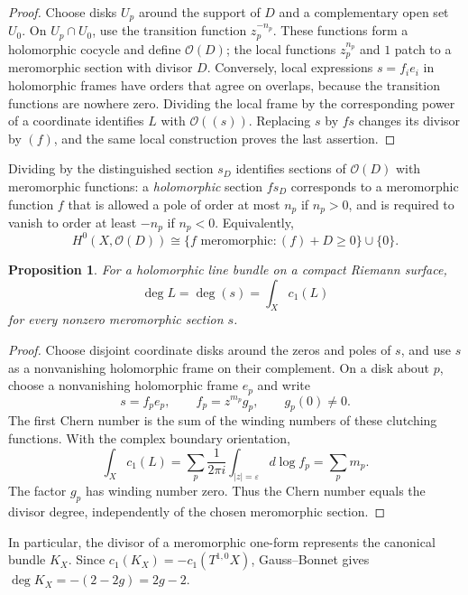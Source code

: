 \documentclass[11pt,oneside,reqno]{book}
\theoremstyle{plain}
\newtheorem{proposition}[theorem]{Proposition}
\theoremstyle{definition}
\theoremstyle{remark}
\begin{document}
\begin{proof}
Choose disks \(U_p\) around the support of \(D\) and a complementary open
set \(U_0\).  On \(U_p\cap U_0\), use the transition function
\(z_p^{-n_p}\).  These functions form a holomorphic cocycle and define
\(\mathcal O(D)\); the local functions \(z_p^{n_p}\) and \(1\) patch to a
meromorphic section with divisor \(D\).  Conversely, local expressions
\(s=f_ie_i\) in holomorphic frames have orders that agree on overlaps,
because the transition functions are nowhere zero.  Dividing the local
frame by the corresponding power of a coordinate identifies \(L\) with
\(\mathcal O((s))\).  Replacing \(s\) by \(fs\) changes its divisor by
\((f)\), and the same local construction proves the last assertion.
\end{proof}

Dividing by the distinguished section \(s_D\) identifies sections of
\(\mathcal O(D)\) with meromorphic functions: a \emph{holomorphic} section
\(fs_D\) corresponds to a meromorphic function \(f\) that is allowed a pole
of order at most \(n_p\) if \(n_p>0\), and is required to vanish to order
at least \(-n_p\) if \(n_p<0\).  Equivalently,
\[
 H^0(X,\mathcal O(D))
 \cong\{f\text{ meromorphic}:(f)+D\geq0\}\cup\{0\}.
\]

\begin{proposition}
For a holomorphic line bundle on a compact Riemann surface,
\[
 \deg L=\deg(s)=\int_Xc_1(L)
\]
for every nonzero meromorphic section \(s\).
\end{proposition}

\begin{proof}
Choose disjoint coordinate disks around the zeros and poles of \(s\), and
use \(s\) as a nonvanishing holomorphic frame on their complement.  On a
disk about \(p\), choose a nonvanishing holomorphic frame \(e_p\) and write
\[
 s=f_pe_p,
 \qquad
 f_p=z^{m_p}g_p,
 \qquad g_p(0)\ne0.
\]
The first Chern number is the sum of the winding numbers of these clutching
functions.  With the complex boundary orientation,
\[
 \int_Xc_1(L)
 =\sum_p\frac{1}{2\pi i}
   \int_{|z|=\varepsilon}d\log f_p
 =\sum_pm_p.
\]
The factor \(g_p\) has winding number zero.  Thus the Chern number equals
the divisor degree, independently of the chosen meromorphic section.
\end{proof}

In particular, the divisor of a meromorphic one-form represents the
canonical bundle \(K_X\). Since
\(c_1(K_X)=-c_1(T^{1,0}X)\), Gauss--Bonnet gives
\(\deg K_X=-(2-2g)=2g-2\).
\end{document}
